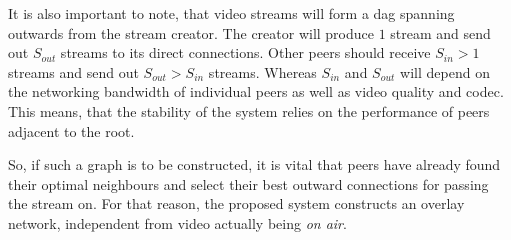 It is also important to note, that video streams will form a \gls{dag} spanning outwards from the stream creator. The creator will produce $1$ stream and send out $S_{out}$ streams to its direct connections. Other peers should receive $S_{in} > 1$ streams and send out $S_{out} > S_{in}$ streams. Whereas $S_{in}$ and $S_{out}$ will depend on the networking bandwidth of individual peers as well as video quality and codec. This means, that the stability of the system relies on the performance of peers adjacent to the root.

So, if such a graph is to be constructed, it is vital that peers have already found their optimal neighbours and select their best outward connections for passing the stream on. For that reason, the proposed system constructs an overlay network, independent from video actually being \textit{on air}.
